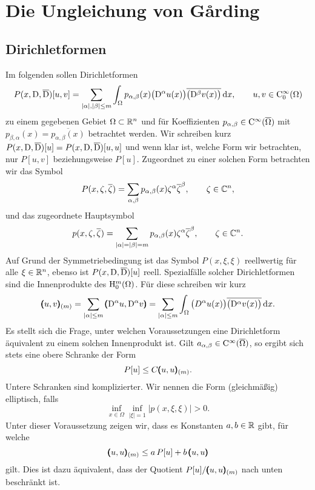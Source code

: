 \chapter{Die Ungleichung von G\r{a}rding}

\section{Dirichletformen}
Im folgenden sollen Dirichletformen 
\begin{equation}
   P(x,\mathrm D,\overline{\mathrm D})[u,v] = \sum_{|\alpha|,|\beta|\le m} \int_\Omega p_{\alpha,\beta}(x) \big(\mathrm D^\alpha u(x)\big) \overline{\big(\mathrm D^\beta v(x)\big)} \,\mathrm d x,\qquad u,v\in\mathrm C_0^\infty(\Omega)
\end{equation}
zu einem gegebenen Gebiet $\Omega\subset\mathbb R^n$ und für Koeffizienten $p_{\alpha,\beta}\in\mathrm C^\infty(\overline{\Omega})$ mit $p_{\beta,\alpha}(x)=\overline{p_{\alpha,\beta}(x)}$  betrachtet werden. Wir schreiben kurz $P(x,\mathrm D,\overline{\mathrm D})[u]=P(x,\mathrm D,\overline{\mathrm D})[u,u]$ und wenn klar ist, welche Form wir betrachten, nur $P[u,v]$ beziehungsweise $P[u]$. Zugeordnet zu einer solchen Form betrachten wir das Symbol
\begin{equation}
   P(x,\zeta,\overline\zeta) = \sum_{\alpha,\beta} p_{\alpha,\beta}(x) \zeta^\alpha\overline\zeta^\beta,\qquad \zeta\in\mathbb C^n,
\end{equation}
und das zugeordnete Hauptsymbol
\begin{equation}
   p(x,\zeta,\overline\zeta) = \sum_{|\alpha|=|\beta|=m} p_{\alpha,\beta}(x) \zeta^\alpha\overline\zeta^\beta,\qquad \zeta\in\mathbb C^n.
\end{equation}
Auf Grund der Symmetriebedingung ist das Symbol $P(x,\xi,\xi)$ reellwertig f\"ur alle $\xi\in\mathbb R^n$, ebenso ist 
$P(x,\mathrm D,\overline {\mathrm D})[u]$ reell. Spezialfälle solcher Dirichletformen sind die Innenprodukte des $\mathrm H^m_0(\Omega)$. Für diese schreiben wir kurz
\begin{equation}
  \pmb(u,v\pmb)_{(m)} = \sum_{|\alpha|\le m} \pmb(\mathrm D^\alpha u,\mathrm D^\alpha v\pmb) = \sum_{|\alpha|\le m} \int_\Omega   \big(D^\alpha u(x)\big) \overline{\big(\mathrm D^\alpha v(x)\big)} \,\mathrm d x.
\end{equation}
Es stellt sich die Frage, unter welchen Voraussetzungen eine Dirichletform äquivalent zu einem solchen Innenprodukt ist. Gilt $a_{\alpha,\beta}\in \mathrm C^\infty(\overline\Omega)$, so ergibt sich stets eine obere Schranke der Form
\begin{equation}
    P[u] \le C \pmb(u,u\pmb)_{(m)}.
\end{equation}
Untere Schranken sind komplizierter. Wir nennen die Form (gleichmäßig) elliptisch, falls 
\begin{equation}
  \inf_{x\in\Omega}  \inf_{|\xi|=1} |p(x,\xi,\xi)| > 0.
\end{equation}
Unter dieser Voraussetzung zeigen wir, dass es Konstanten $a,b\in\mathbb R$ gibt, für welche
\begin{equation} 
   \pmb(u,u\pmb)_{(m)} \le a\, P[u] + b\, \pmb(u,u\pmb)
\end{equation}
gilt. Dies ist dazu äquivalent, dass der Quotient $P [u]  / \pmb(u,u\pmb)_{(m)}$ nach unten beschränkt ist.

